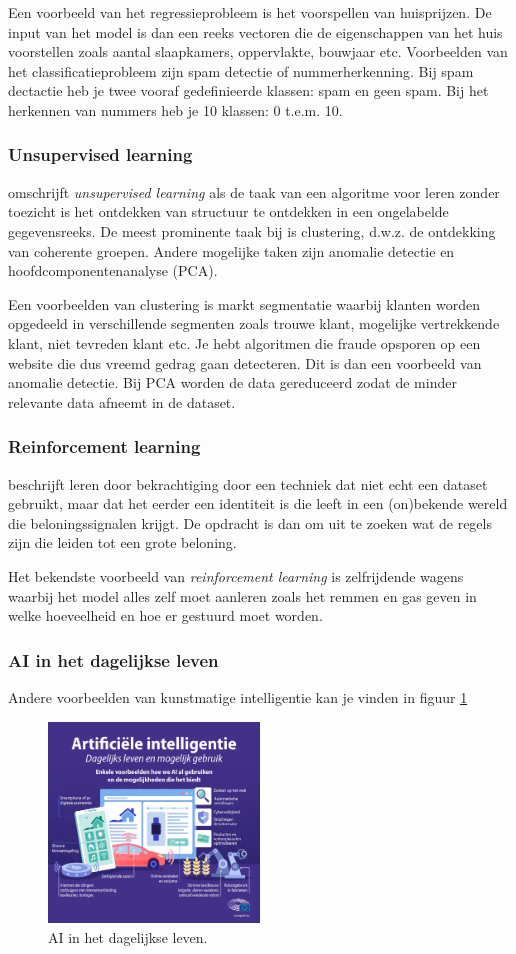 Een voorbeeld van het regressieprobleem is het voorspellen van huisprijzen. De input van het model is dan een reeks vectoren die de eigenschappen van het huis voorstellen zoals aantal slaapkamers, oppervlakte, bouwjaar etc.
Voorbeelden van het classificatieprobleem zijn spam detectie of nummerherkenning. Bij spam dectactie heb je twee vooraf gedefinieerde klassen: spam en geen spam. Bij het herkennen van nummers heb je 10 klassen: 0 t.e.m. 10.

\subsubsection{Unsupervised learning}
\textcite{Lievens2021} omschrijft \textit{unsupervised learning} als de taak van een algoritme voor leren zonder toezicht is het ontdekken van structuur te ontdekken in een ongelabelde gegevensreeks. De meest prominente taak bij  is clustering, d.w.z. de ontdekking van coherente
groepen. Andere mogelijke taken zijn anomalie detectie en hoofdcomponentenanalyse (PCA).

Een voorbeelden van clustering is markt segmentatie waarbij klanten worden opgedeeld in verschillende segmenten zoals trouwe klant, mogelijke vertrekkende klant, niet tevreden klant etc.
Je hebt algoritmen die fraude opsporen op een website die dus vreemd gedrag gaan detecteren. Dit is dan een voorbeeld van anomalie detectie.
Bij PCA worden de data gereduceerd zodat de minder relevante data afneemt in de dataset.


\subsubsection{Reinforcement learning}
\textcite{Lievens2021} beschrijft leren door bekrachtiging door een techniek dat niet echt een dataset gebruikt, maar dat het eerder een identiteit is die leeft in een (on)bekende wereld die beloningssignalen krijgt. De opdracht is dan om uit te zoeken wat de regels zijn die leiden tot een grote beloning.

Het bekendste voorbeeld van \textit{reinforcement learning} is zelfrijdende wagens waarbij het model alles zelf moet aanleren zoals het remmen en gas geven in welke hoeveelheid en hoe er gestuurd moet worden.

\subsubsection{AI in het dagelijkse leven}

Andere voorbeelden van kunstmatige intelligentie kan je vinden in figuur \ref{fig:3}

\begin{figure}
    \centering
    \includegraphics[width=0.5\textwidth]{./img/ai_voorbeelden.jpg}
    \caption{\label{fig:3} AI in het dagelijkse leven. \autocite{EuropeesParlement2020}}
\end{figure}

